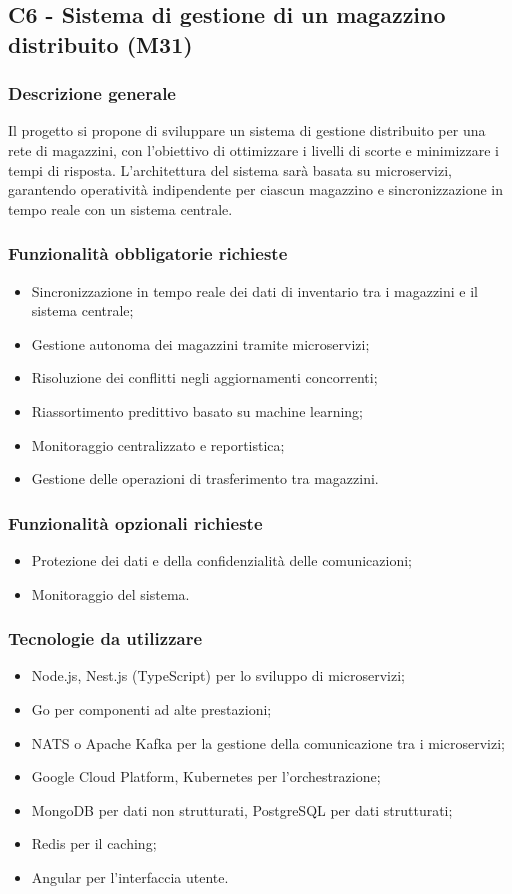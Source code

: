 \documentclass[10pt]{article}
\begin{document}
\subsection{C6 - Sistema di gestione di un magazzino distribuito (M31)}
\subsubsection{Descrizione generale}
Il progetto si propone di sviluppare un sistema di gestione distribuito per una rete di magazzini, con l'obiettivo di ottimizzare i livelli di scorte e minimizzare i tempi di risposta. L'architettura del sistema sarà basata su microservizi, garantendo operatività indipendente per ciascun magazzino e sincronizzazione in tempo reale con un sistema centrale.
\subsubsection{Funzionalità obbligatorie richieste}
\begin{itemize}
    \item Sincronizzazione in tempo reale dei dati di inventario tra i magazzini e il sistema centrale;
    \item Gestione autonoma dei magazzini tramite microservizi;
    \item Risoluzione dei conflitti negli aggiornamenti concorrenti;
    \item Riassortimento predittivo basato su machine learning;
    \item Monitoraggio centralizzato e reportistica;
    \item Gestione delle operazioni di trasferimento tra magazzini.
\end{itemize}
\subsubsection{Funzionalità opzionali richieste}
\begin{itemize}
    \item Protezione dei dati e della confidenzialità delle comunicazioni;
    \item Monitoraggio del sistema.
\end{itemize}
\subsubsection{Tecnologie da utilizzare}
\begin{itemize}
\item Node.js, Nest.js (TypeScript) per lo sviluppo di microservizi;
\item Go per componenti ad alte prestazioni;
\item NATS o Apache Kafka per la gestione della comunicazione tra i microservizi;
\item Google Cloud Platform, Kubernetes per l'orchestrazione;
\item MongoDB per dati non strutturati, PostgreSQL per dati strutturati;
\item Redis per il caching;
\item Angular per l'interfaccia utente.
\end{itemize}
\end{document}
